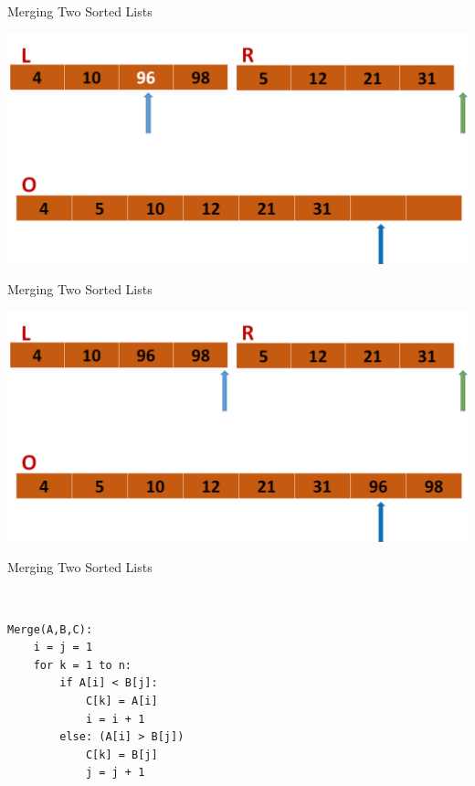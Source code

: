 \documentclass{beamer}
\newcommand{\tblue}[1]{{\Large {\textcolor{azure}{#1}}}}
\begin{document}
\begin{frame}{Merging Two Sorted Lists}
\begin{center}
    \includegraphics[scale=0.4]{mergeStep7.png}
\end{center}
\end{frame}




\begin{frame}{Merging Two Sorted Lists}
\begin{center}
    \includegraphics[scale=0.4]{mergeStep8.png}
\end{center}
\end{frame}


\begin{frame}[fragile]{Merging Two Sorted Lists}

\tblue{Merge Pseudocode:}

\begin{verbatim}
Merge(A,B,C):
    i = j = 1
    for k = 1 to n:
        if A[i] < B[j]:
            C[k] = A[i]
            i = i + 1
        else: (A[i] > B[j])
            C[k] = B[j]
            j = j + 1
\end{verbatim}
\end{frame}
\end{document}
